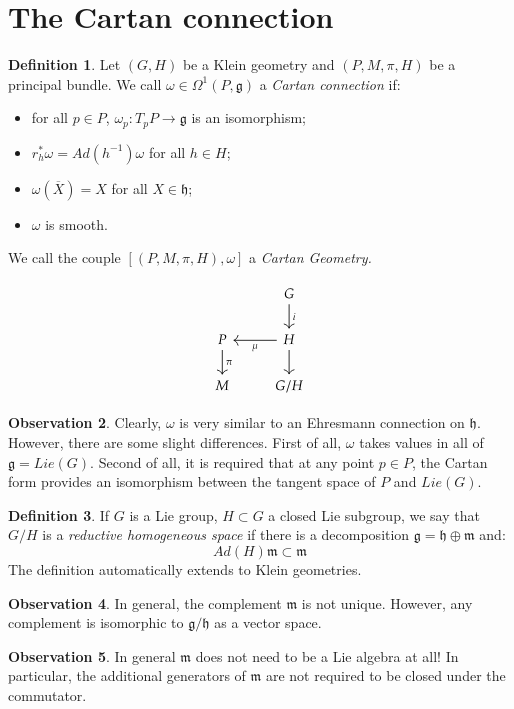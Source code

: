 \documentclass[12pt,a4paper]{report}
\theoremstyle{definition}
\newtheorem{Def}{Definition}[chapter]
\theoremstyle{Theorem}
\theoremstyle{break}
\theoremstyle{definition}
\newtheorem{Obs}[Def]{Observation}
\begin{document}
		\section{The Cartan connection}
		\begin{Def}
			Let $(G,H)$ be a Klein geometry and $(P,M,\pi,H)$ be a principal bundle. We call $\omega\in\Omega^1(P,\mathfrak{g})$ a \textit{Cartan connection} if:
			\begin{itemize}
				\item for all $p\in P$, $\omega_p:T_pP\rightarrow \mathfrak{g}$ is an isomorphism;
				\item $r_h^*\omega=Ad(h^{-1})\omega$ for all $h\in H$;
				\item $\omega(\overline{X})=X$ for all $X\in \mathfrak{h}$;
				\item $\omega$ is smooth.
			\end{itemize}
			We call the couple $[(P,M,\pi,H),\omega]$ a \textit{Cartan Geometry.}
		\end{Def}
		$$\begin{tikzcd}
			& G \arrow{d}{i}\\
			P \arrow{d}{\pi} & H \arrow{l}{\mu} \arrow{d}\\
			M & G/H
		\end{tikzcd}$$
		\begin{Obs}
			Clearly, $\omega$ is very similar to an Ehresmann connection on $\mathfrak{h}$. However, there are some slight differences. First of all, $\omega$ takes values in all of $\mathfrak{g}=Lie(G)$. Second of all, it is required that at any point $p\in P$, the Cartan form provides an isomorphism between the tangent space of $P$ and $Lie(G)$.
		\end{Obs}
		\begin{Def}
			If $G$ is a Lie group, $H\subset G$ a closed Lie subgroup, we say that $G/H$ is a \textit{reductive homogeneous space} if there is a decomposition $\mathfrak{g}=\mathfrak{h}\oplus\mathfrak{m}$ and:
			$$Ad(H)\mathfrak{m}\subset \mathfrak{m}$$
			The definition automatically extends to Klein geometries. 
		\end{Def}
		\begin{Obs}
			In general, the complement $\mathfrak{m}$ is not unique. However, any complement is isomorphic to $\mathfrak{g/h}$ as a vector space.
		\end{Obs}
		\begin{Obs}
			In general $\mathfrak{m}$ does not need to be a Lie algebra at all! In particular, the additional generators of $\mathfrak{m}$ are not required to be closed under the commutator.
		\end{Obs}
\end{document}

